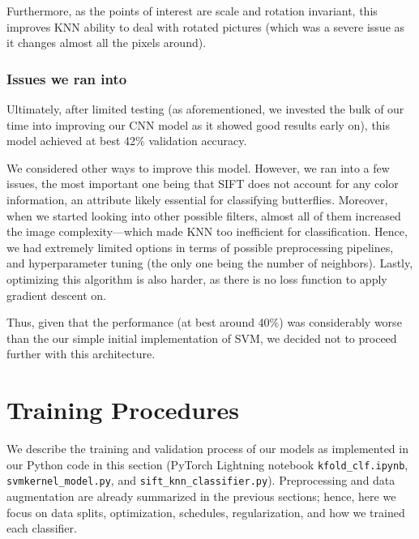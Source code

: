 \documentclass[10pt]{article} %
\begin{document}
Furthermore, as the points of interest are scale and rotation invariant, this improves KNN ability to deal with rotated pictures (which was a severe issue as it changes almost all the pixels around).
\subsubsection{Issues we ran into}
Ultimately, after limited testing (as aforementioned, we invested the bulk of our time into improving our CNN model as it showed good results early on), this model achieved at best 42\% validation accuracy. \par
We considered other ways to improve this model. However, we ran into a few issues, the most important one being that SIFT does not account for any color information, an attribute likely essential for classifying butterflies. Moreover, when we started looking into other possible filters, almost all of them increased the image complexity---which made KNN too inefficient for classification. Hence, we had extremely limited options in terms of possible preprocessing pipelines, and hyperparameter tuning (the only one being the number of neighbors). Lastly, optimizing this algorithm is also harder, as there is no loss function to apply gradient descent on.\par

Thus, given that the performance (at best around 40\%) was considerably worse than the our simple initial implementation of SVM, we decided not to proceed further with this architecture. \par

\section{Training Procedures}
We describe the training and validation process of our models as implemented in our Python code in this section (PyTorch Lightning notebook \texttt{kfold\_clf.ipynb}, \texttt{svmkernel\_model.py}, and \texttt{sift\_knn\_classifier.py}). Preprocessing and data augmentation are already summarized in the previous sections; hence, here we focus on data splits, optimization, schedules, regularization, and how we trained each classifier.
\end{document}
